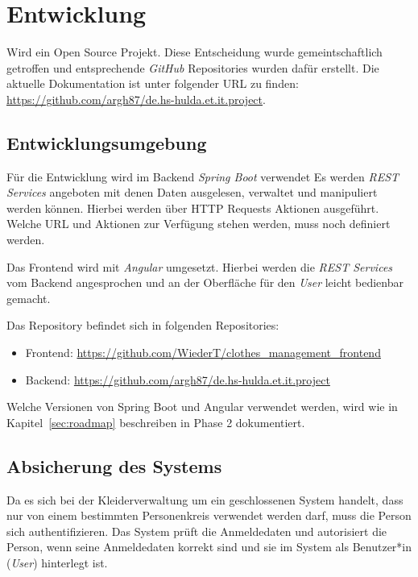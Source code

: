 \section{Entwicklung}\label{sec:Entwicklung}

\project Wird ein Open Source Projekt. Diese Entscheidung wurde gemeintschaftlich getroffen und entsprechende \textit{GitHub} Repositories wurden dafür erstellt. Die aktuelle Dokumentation ist unter folgender URL zu finden: \url{https://github.com/argh87/de.hs-hulda.et.it.project}.

\subsection{Entwicklungsumgebung}\label{sec:Umgebung}

Für die Entwicklung wird im Backend \textit{Spring Boot} verwendet Es werden \textit{REST Services} angeboten mit denen Daten ausgelesen, verwaltet und manipuliert werden können. Hierbei werden über HTTP Requests Aktionen ausgeführt. Welche URL und Aktionen zur Verfügung stehen werden, muss noch definiert werden.

Das Frontend wird mit \textit{Angular} umgesetzt. Hierbei werden die \textit{REST Services} vom Backend angesprochen und an der Oberfläche für den \textit{User} leicht bedienbar gemacht.

Das Repository befindet sich in folgenden Repositories:

\begin{itemize}
\item Frontend: \url{https://github.com/WiederT/clothes_management_frontend}
\item Backend: \url{https://github.com/argh87/de.hs-hulda.et.it.project}
\end{itemize}

Welche Versionen von Spring Boot und Angular verwendet werden, wird wie in Kapitel~\ref{sec:roadmap} beschreiben in Phase 2 dokumentiert.

\subsection{Absicherung des Systems}\label{sec:Security}

Da es sich bei der Kleiderverwaltung um ein geschlossenen System handelt, dass nur von einem bestimmten Personenkreis verwendet werden darf, muss die Person sich authentifizieren. Das System prüft die Anmeldedaten und autorisiert die Person, wenn seine Anmeldedaten korrekt sind und sie im System als Benutzer*in (\textit{User}) hinterlegt ist.

